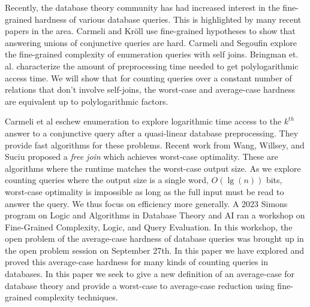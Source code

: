 \documentclass[11pt,letterpaper,pdftex]{article}
\newcounter{definition}
\begin{document}
Recently, the database theory community has had increased interest in the fine-grained hardness of various database queries. 
This is highlighted by many recent papers in the area. 
Carmeli and Kröll \cite{kroll2021} use fine-grained hypotheses to show that answering unions of conjunctive queries are hard.
Carmeli and Segoufin \cite{selfJoinsHard2023} explore the fine-grained complexity of enumeration queries with self joins. 
Bringman et. al. \cite{tightFineGrainedCarmeli} characterize the amount of preprocessing time needed to get polylogarithmic access time. 
We will show that for counting queries over a constant number of relations that don't involve self-joins, the worst-case and average-case hardness are equivalent up to polylogarithmic factors.

Carmeli et al \cite{CarmeliTGKR23} eschew enumeration to explore  logarithmic time access to the $k^{th}$ answer to a conjunctive query after a quasi-linear database preprocessing. 
They provide fast algorithms for these problems.
Recent work from Wang, Willsey, and Suciu \cite{WangWS23} proposed a \emph{free join} which achieves worst-case optimality. 
These are algorithms where the runtime matches the worst-case output size. 
As we explore counting queries where the output size is a single word, $O(\lg(n))$ bits, worst-case optimality is impossible as long as the full input must be read to answer the query. 
We thus focus on efficiency more generally. 
A 2023 Simons program on Logic and Algorithms in Database Theory and AI ran a workshop on Fine-Grained Complexity, Logic, and Query Evaluation\cite{simons_fine_grained_complexity_2023}. 
In this workshop, the open problem of the average-case hardness of database queries was brought up in the open problem session on September 27th. 
In this paper we have explored and proved this average-case hardness for many kinds of counting queries in databases. 
In this paper we seek to give a new definition of an average-case for database theory and provide a worst-case to average-case reduction using fine-grained complexity techniques. 
\end{document}
